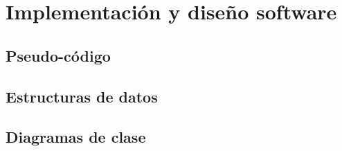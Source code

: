 \section{Implementación y diseño software}
\subsection{Pseudo-código}
\subsection{Estructuras de datos}
\subsection{Diagramas de clase}

